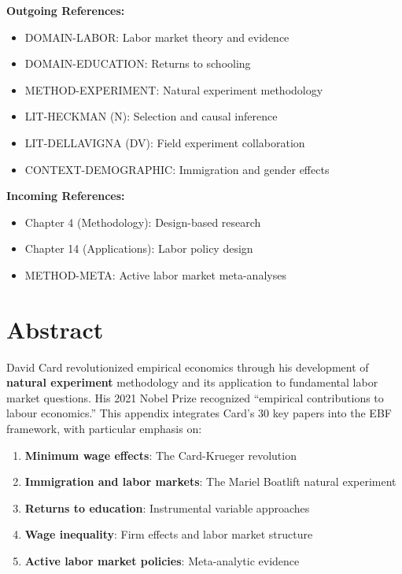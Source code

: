 \begin{tcolorbox}[colback=green!5!white, colframe=green!75!black, title=Cross-Reference Map]
\textbf{Outgoing References:}
\begin{itemize}[nosep]
    \item DOMAIN-LABOR: Labor market theory and evidence
    \item DOMAIN-EDUCATION: Returns to schooling
    \item METHOD-EXPERIMENT: Natural experiment methodology
    \item LIT-HECKMAN (N): Selection and causal inference
    \item LIT-DELLAVIGNA (DV): Field experiment collaboration
    \item CONTEXT-DEMOGRAPHIC: Immigration and gender effects
\end{itemize}

\textbf{Incoming References:}
\begin{itemize}[nosep]
    \item Chapter 4 (Methodology): Design-based research
    \item Chapter 14 (Applications): Labor policy design
    \item METHOD-META: Active labor market meta-analyses
\end{itemize}
\end{tcolorbox}

\section*{Abstract}

David Card revolutionized empirical economics through his development of \textbf{natural experiment} methodology and its application to fundamental labor market questions. His 2021 Nobel Prize recognized ``empirical contributions to labour economics.'' This appendix integrates Card's 30 key papers into the EBF framework, with particular emphasis on:
\begin{enumerate}
    \item \textbf{Minimum wage effects}: The Card-Krueger revolution
    \item \textbf{Immigration and labor markets}: The Mariel Boatlift natural experiment
    \item \textbf{Returns to education}: Instrumental variable approaches
    \item \textbf{Wage inequality}: Firm effects and labor market structure
    \item \textbf{Active labor market policies}: Meta-analytic evidence
\end{enumerate}

